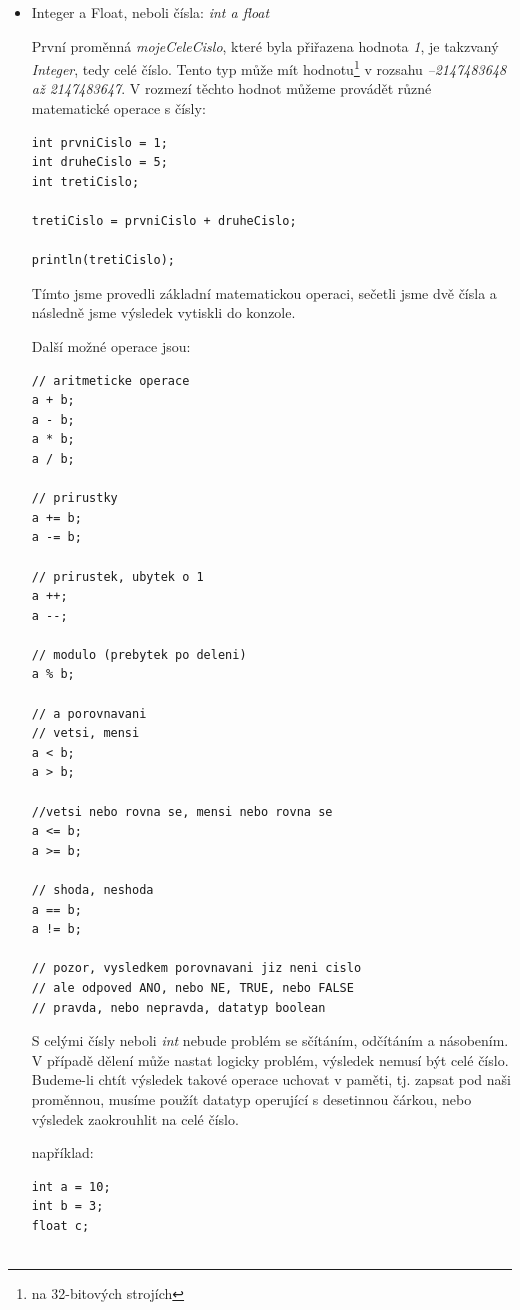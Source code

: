 \documentclass[10pt]{book}
\begin{document}
\begin{itemize}


\item{Integer a Float, neboli čísla: {\em int a float}}

První proměnná {\em mojeCeleCislo}, které byla přiřazena hodnota {\em 1}, je takzvaný {\em Integer}, tedy celé číslo. Tento typ může mít hodnotu\footnote{na 32-bitových strojích} v rozsahu {\em –2147483648 až 2147483647}. V rozmezí těchto hodnot můžeme provádět různé matematické operace s čísly:

\begin{lstlisting}
int prvniCislo = 1;
int druheCislo = 5;
int tretiCislo;

tretiCislo = prvniCislo + druheCislo;

println(tretiCislo);
\end{lstlisting}

Tímto jsme provedli základní matematickou operaci, sečetli jsme dvě čísla a následně jsme výsledek vytiskli do konzole.

Další možné operace jsou:

\begin{lstlisting}
// aritmeticke operace
a + b;
a - b;
a * b;
a / b;

// prirustky
a += b;
a -= b;

// prirustek, ubytek o 1
a ++;
a --;

// modulo (prebytek po deleni)
a % b;

// a porovnavani
// vetsi, mensi
a < b;
a > b;

//vetsi nebo rovna se, mensi nebo rovna se
a <= b;
a >= b;

// shoda, neshoda
a == b;
a != b;

// pozor, vysledkem porovnavani jiz neni cislo
// ale odpoved ANO, nebo NE, TRUE, nebo FALSE
// pravda, nebo nepravda, datatyp boolean

\end{lstlisting}

S celými čísly neboli {\em int} nebude problém se sčítáním, odčítáním a násobením. V případě dělení může nastat logicky problém, výsledek nemusí být celé číslo. Budeme-li chtít výsledek takové operace uchovat v paměti, tj. zapsat pod naši proměnnou, musíme použít datatyp operující s desetinnou čárkou, nebo výsledek zaokrouhlit na celé číslo.

například:

\begin{lstlisting}
int a = 10;
int b = 3;
float c;


\end{lstlisting}
\end{itemize}
\end{document}
